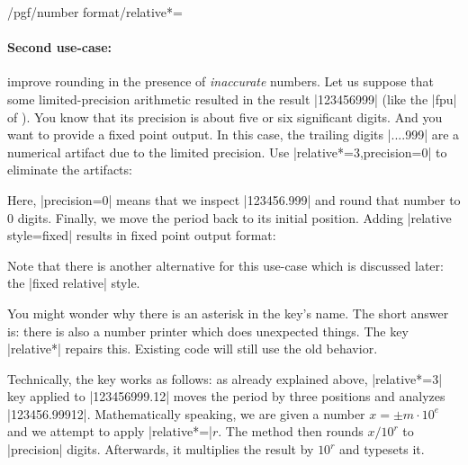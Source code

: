 \begin{keylist}{/pgf/number format/relative*=}
    \paragraph{Second use-case:}

    improve rounding in the presence of \emph{inaccurate} numbers. Let us
    suppose that some limited-precision arithmetic resulted in the result
    |123456999| (like the |fpu| of \pgfname). You know that its precision is
    about five or six significant digits. And you want to provide a fixed point
    output. In this case, the trailing digits |....999| are a numerical
    artifact due to the limited precision. Use |relative*=3,precision=0| to
    eliminate the artifacts:
\begin{codeexample}[pre={\begin{lateximage}},post={\end{lateximage}}]
\hspace{1em}
\end{codeexample}
    \noindent Here, |precision=0| means that we inspect |123456.999| and round
    that number to $0$ digits. Finally, we move the period back to its initial
    position. Adding |relative style=fixed| results in fixed point output
    format:
\begin{codeexample}[pre={\begin{lateximage}},post={\end{lateximage}}]
\hspace{1em}
\end{codeexample}
    \noindent Note that there is another alternative for this use-case which is
    discussed later: the |fixed relative| style.
\begin{codeexample}[pre={\begin{lateximage}},post={\end{lateximage}}]
\hspace{1em}
\end{codeexample}

    You might wonder why there is an asterisk in the key's name. The short
    answer is: there is also a 
    number printer which does unexpected things. The key |relative*| repairs
    this. Existing code will still use the old behavior.

    Technically, the key works as follows: as already explained above,
    |relative*=3| key applied to |123456999.12| moves the period by three
    positions and analyzes |123456.99912|. Mathematically speaking, we are
    given a number $x = \pm m \cdot 10^e$ and we attempt to apply
    |relative*=|$r$. The method then rounds $x / 10^r$ to |precision| digits.
    Afterwards, it multiplies the result by $10^r$ and typesets it.
\end{keylist}

